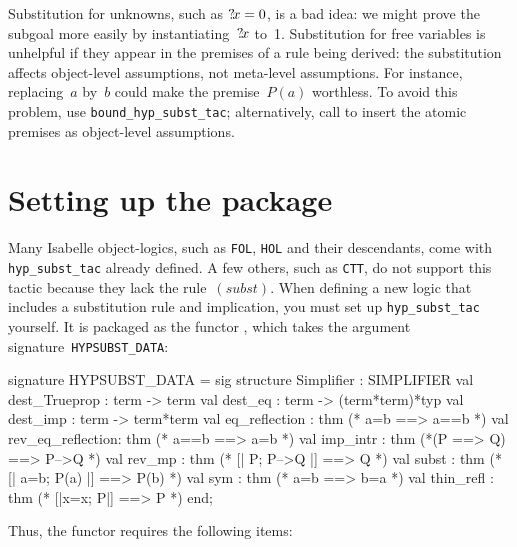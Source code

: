 Substitution for unknowns, such as ${?\!x}=0$, is a bad idea: we might prove
the subgoal more easily by instantiating~${?\!x}$ to~1.
Substitution for free variables is unhelpful if they appear in the
premises of a rule being derived: the substitution affects object-level
assumptions, not meta-level assumptions.  For instance, replacing~$a$
by~$b$ could make the premise~$P(a)$ worthless.  To avoid this problem, use
\texttt{bound_hyp_subst_tac}; alternatively, call  to
insert the atomic premises as object-level assumptions.


\section{Setting up the package} 
Many Isabelle object-logics, such as \texttt{FOL}, \texttt{HOL} and their
descendants, come with \texttt{hyp_subst_tac} already defined.  A few others,
such as \texttt{CTT}, do not support this tactic because they lack the
rule~$(subst)$.  When defining a new logic that includes a substitution
rule and implication, you must set up \texttt{hyp_subst_tac} yourself.  It
is packaged as the \ML{} functor , which takes the
argument signature~\texttt{HYPSUBST_DATA}:
\begin{ttbox} 
signature HYPSUBST_DATA =
  sig
  structure Simplifier : SIMPLIFIER
  val dest_Trueprop    : term -> term
  val dest_eq          : term -> (term*term)*typ
  val dest_imp         : term -> term*term
  val eq_reflection    : thm         (* a=b ==> a==b *)
  val rev_eq_reflection: thm         (* a==b ==> a=b *)
  val imp_intr         : thm         (*(P ==> Q) ==> P-->Q *)
  val rev_mp           : thm         (* [| P;  P-->Q |] ==> Q *)
  val subst            : thm         (* [| a=b;  P(a) |] ==> P(b) *)
  val sym              : thm         (* a=b ==> b=a *)
  val thin_refl        : thm         (* [|x=x; P|] ==> P *)
  end;
\end{ttbox}
Thus, the functor requires the following items:
